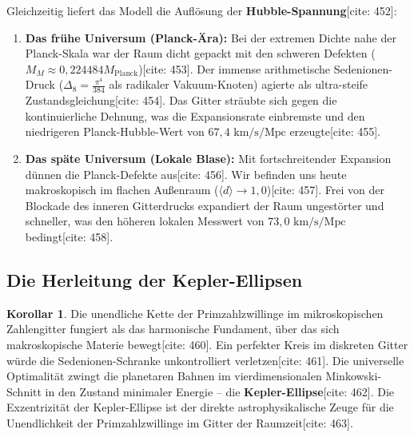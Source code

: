 \documentclass[11pt,a4paper]{article}
\newcommand{\Mplanck}{M_{\text{Planck}}}
\theoremstyle{definition}
\newtheorem{corollary}[theorem]{Korollar}
\begin{document}
	Gleichzeitig liefert das Modell die Auflösung der \textbf{Hubble-Spannung}[cite: 452]:
	\begin{enumerate}
		\item \textbf{Das frühe Universum (Planck-Ära):} Bei der extremen Dichte nahe der Planck-Skala war der Raum dicht gepackt mit den schweren Defekten ($M_M \approx 0{,}224484 \Mplanck$)[cite: 453]. Der immense arithmetische Sedenionen-Druck ($\Delta_8 = \frac{\pi^4}{384}$ als radikaler Vakuum-Knoten) agierte als ultra-steife Zustandsgleichung[cite: 454]. Das Gitter sträubte sich gegen die kontinuierliche Dehnung, was die Expansionsrate einbremste und den niedrigeren Planck-Hubble-Wert von $67{,}4 \text{ km/s/Mpc}$ erzeugte[cite: 455].
		\item \textbf{Das späte Universum (Lokale Blase):} Mit fortschreitender Expansion dünnen die Planck-Defekte aus[cite: 456]. Wir befinden uns heute makroskopisch im flachen Außenraum ($\langle d \rangle \rightarrow 1{,}0$)[cite: 457]. Frei von der Blockade des inneren Gitterdrucks expandiert der Raum ungestörter und schneller, was den höheren lokalen Messwert von $73{,}0 \text{ km/s/Mpc}$ bedingt[cite: 458].
	\end{enumerate}
	
	\subsection{Die Herleitung der Kepler-Ellipsen}
	\begin{corollary}
		Die unendliche Kette der Primzahlzwillinge im mikroskopischen Zahlengitter fungiert als das harmonische Fundament, über das sich makroskopische Materie bewegt[cite: 460]. Ein perfekter Kreis im diskreten Gitter würde die Sedenionen-Schranke unkontrolliert verletzen[cite: 461]. Die universelle Optimalität zwingt die planetaren Bahnen im vierdimensionalen Minkowski-Schnitt in den Zustand minimaler Energie -- die \textbf{Kepler-Ellipse}[cite: 462]. Die Exzentrizität der Kepler-Ellipse ist der direkte astrophysikalische Zeuge für die Unendlichkeit der Primzahlzwillinge im Gitter der Raumzeit[cite: 463].
	\end{corollary}
	
\end{document}
